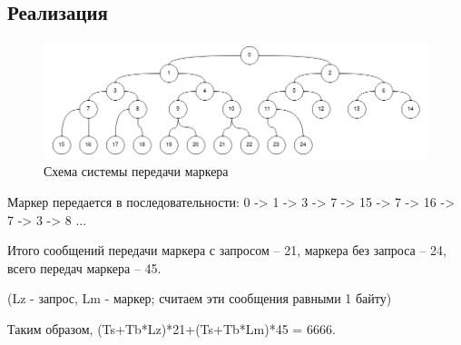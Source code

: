 \documentclass[a4paper,12pt,titlepage,final]{article}
\begin{document}
\subsection{Реализация}
\begin{figure}[h!]
  \includegraphics[width=1\linewidth]{marker.png}
  \caption{Схема системы передачи маркера}
  \label{fig:marker}
\end{figure}
Маркер передается в последовательности: 0 -> 1 -> 3 -> 7 -> 15 -> 7 -> 16 -> 7 -> 3 -> 8 ...\par
Итого сообщений передачи маркера с запросом – 21, маркера без запроса – 24, всего передач маркера – 45.\par
(Lz - запрос, Lm - маркер; считаем эти сообщения равными 1 байту)\par
Таким образом, (Ts+Tb*Lz)*21+(Ts+Tb*Lm)*45 = 6666.
\end{document}

